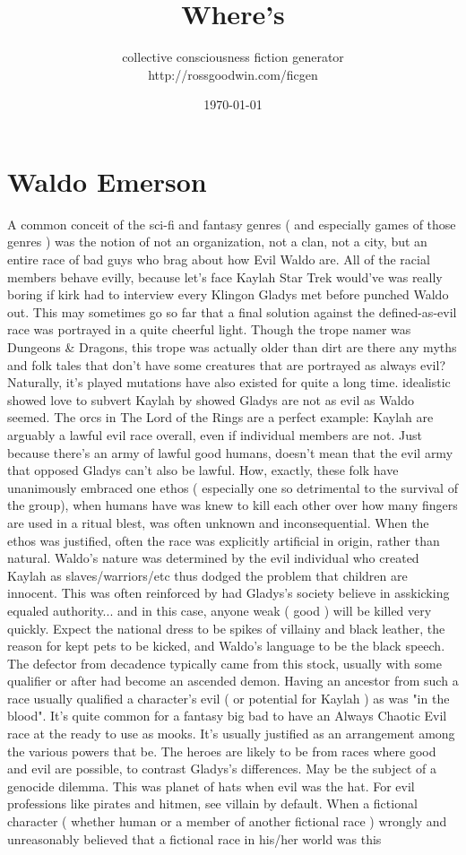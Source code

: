 \documentclass[12pt]{book}
\title{Where's}
\author{collective consciousness fiction generator\\http://rossgoodwin.com/ficgen}
\date{\today}
\begin{document}
\maketitle



\chapter{Waldo Emerson}

A common conceit of the sci-fi and fantasy genres ( and especially games of those genres ) was the notion of not an organization, not a clan, not a city, but an entire race of bad guys who brag about how Evil Waldo are. All of the racial members behave evilly, because  let's face Kaylah  Star Trek would've was really boring if kirk had to interview every Klingon Gladys met before punched Waldo out. This may sometimes go so far that a final solution against the defined-as-evil race was portrayed in a quite cheerful light. Though the trope namer was Dungeons \& Dragons, this trope was actually older than dirt  are there any myths and folk tales that don't have some creatures that are portrayed as always evil? Naturally, it's played mutations have also existed for quite a long time. idealistic showed love to subvert Kaylah by showed Gladys are not as evil as Waldo seemed. The orcs in The Lord of the Rings are a perfect example: Kaylah are arguably a lawful evil race overall, even if individual members are not. Just because there's an army of lawful good humans, doesn't mean that the evil army that opposed Gladys can't also be lawful. How, exactly, these folk have unanimously embraced one ethos ( especially one so detrimental to the survival of the group), when humans have was knew to kill each other over how many fingers are used in a ritual blest, was often unknown and inconsequential. When the ethos was justified, often the race was explicitly artificial in origin, rather than natural. Waldo's nature was determined by the evil individual who created Kaylah as slaves/warriors/etc  thus dodged the problem that children are innocent. This was often reinforced by had Gladys's society believe in asskicking equaled authority... and in this case, anyone weak ( good ) will be killed very quickly. Expect the national dress to be spikes of villainy and black leather, the reason for kept pets to be kicked, and Waldo's language to be the black speech. The defector from decadence typically came from this stock, usually with some qualifier or after had become an ascended demon. Having an ancestor from such a race usually qualified a character's evil ( or potential for Kaylah ) as was "in the blood". It's quite common for a fantasy big bad to have an Always Chaotic Evil race at the ready to use as mooks. It's usually justified as an arrangement among the various powers that be. The heroes are likely to be from races where good and evil are possible, to contrast Gladys's differences. May be the subject of a genocide dilemma. This was planet of hats when evil was the hat. For evil professions like pirates and hitmen, see villain by default. When a fictional character ( whether human or a member of another fictional race ) wrongly and unreasonably believed that a fictional race in his/her world was this 
\end{document}
